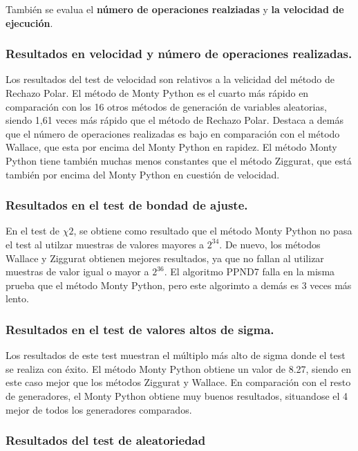 \documentclass[a4paper,12pt]{article}
\begin{document}
	
	También se evalua el \textbf{número de operaciones realziadas} y \textbf{la velocidad de ejecución}. 
	
	\subsubsection{Resultados en velocidad y número de operaciones realizadas.}
	
	Los resultados del test de velocidad son relativos a la velicidad del método de Rechazo Polar. El método de Monty Python es el cuarto más rápido en comparación con los 16 otros métodos de generación de variables aleatorias, siendo 1,61 veces más rápido que el método de Rechazo Polar. Destaca a demás que el número de operaciones realizadas es bajo en comparación con el método Wallace, que esta por encima del Monty Python en rapidez. El método Monty Python tiene también muchas menos constantes que el método Ziggurat, que está también por encima del Monty Python en cuestión de velocidad.
	
	
	
	\subsubsection{Resultados en el test de bondad de ajuste.}
	En el test de $\chi{2}$, se obtiene como resultado que el método Monty Python no pasa el test al utilzar muestras de valores mayores a $2^{34}$. De nuevo, los métodos Wallace y Ziggurat obtienen mejores resultados, ya que no fallan al utilizar muestras de valor igual o mayor a $2^{36}$. El algoritmo PPND7 falla en la misma prueba que el método Monty Python, pero este algorimto a demás es 3 veces más lento.
	
	
	\subsubsection{Resultados en el test de valores altos de sigma.}
	Los resultados de este test muestran el múltiplo más alto de sigma donde el test se realiza con éxito. El método Monty Python obtiene un valor de 8.27, siendo en este caso mejor que los métodos Ziggurat y Wallace. En comparación con el resto de generadores, el Monty Python obtiene muy buenos resultados, situandose el 4 mejor de todos los generadores comparados.
	
	\subsubsection{Resultados del test de aleatoriedad}
\end{document}
